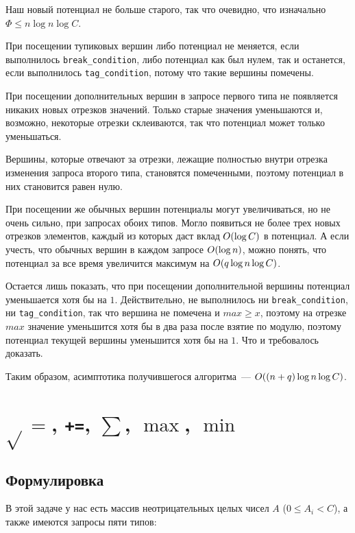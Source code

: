 Наш новый потенциал не больше старого, так что очевидно, что изначально $\Phi \le n \log n \log C$.

При посещении тупиковых вершин либо потенциал не меняется, если выполнилось \verb+break_condition+, либо потенциал как был нулем, так и останется, если выполнилось \verb+tag_condition+, потому что такие вершины помечены.

При посещении дополнительных вершин в запросе первого типа не появляется никаких новых отрезков значений. Только старые значения уменьшаются и, возможно, некоторые отрезки склеиваются, так что потенциал может только уменьшаться.

Вершины, которые отвечают за отрезки, лежащие полностью внутри отрезка изменения запроса второго типа, становятся помеченными, поэтому потенциал в них становится равен нулю.

При посещении же обычных вершин потенциалы могут увеличиваться, но не очень сильно, при запросах обоих типов. Могло появиться не более трех новых отрезков элементов, каждый из которых даст вклад $O(\log C)$ в потенциал. А если учесть, что обычных вершин в каждом запросе $O(\log n)$, можно понять, что потенциал за все время увеличится максимум на $O(q \log n \log C)$.

Остается лишь показать, что при посещении дополнительной вершины потенциал уменьшается хотя бы на $1$. Действительно, не выполнилось ни \verb+break_condition+, ни \verb+tag_condition+, так что вершина не помечена и $max \ge x$, поэтому на отрезке $max$ значение уменьшится хотя бы в два раза после взятие по модулю, поэтому потенциал текущей вершины уменьшится хотя бы на $1$. Что и требовалось доказать.

Таким образом, асимптотика получившегося алгоритма~--- $O((n + q) \log n \log C)$.

\cprotect \section{$\sqrt{}=$, \verb^+=^, $\sum$, $\max$, $\min$}

\subsection{Формулировка}

В этой задаче у нас есть массив неотрицательных целых чисел $A$ ($0 \le A_i < C$), а также имеются запросы пяти типов:

